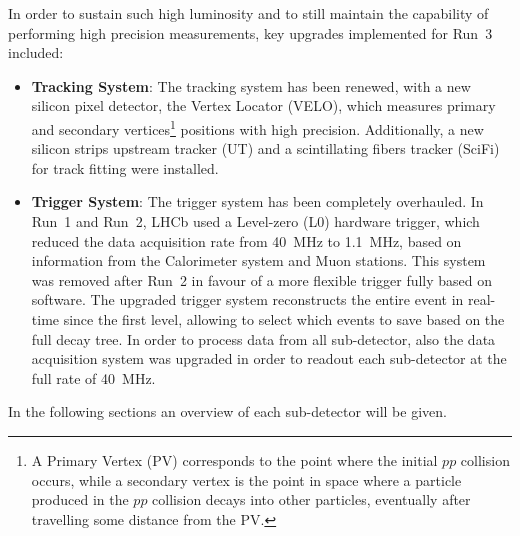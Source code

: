 In order to sustain such high luminosity and to still maintain the capability of performing high precision measurements, key upgrades implemented for Run~3 included:
\begin{itemize}
\item \textbf{Tracking System}: The tracking system has been renewed, with a new silicon pixel detector, the Vertex Locator (VELO), which measures primary and secondary vertices\footnote{A Primary Vertex (PV) corresponds to the point where the initial $pp$  collision occurs, while a secondary vertex is the point in space where a particle produced in the $pp$ collision decays into other particles, eventually after travelling some distance from the PV.} positions with high precision. Additionally, a new silicon strips upstream tracker (UT) and a scintillating fibers tracker (SciFi) for track fitting were installed.

\item \textbf{Trigger System}: The trigger system has been completely overhauled. In Run~1 and Run~2, LHCb used a Level-zero (L$0$) hardware trigger, which reduced the data acquisition rate from \SI{40}{\mega\hertz} to \SI{1.1}{\mega\hertz}, based on information from the Calorimeter system and Muon stations. This system was removed after Run~2 in favour of a more flexible trigger fully based on software. The upgraded trigger system reconstructs the entire event in real-time since the first level, allowing to select which events to save based on the full decay tree. In order to process data from all sub-detector, also the data acquisition system was upgraded in order to readout each sub-detector at the full rate of \SI{40}{\mega\hertz}.
\end{itemize}
In the following sections an overview of each sub-detector will be given.

